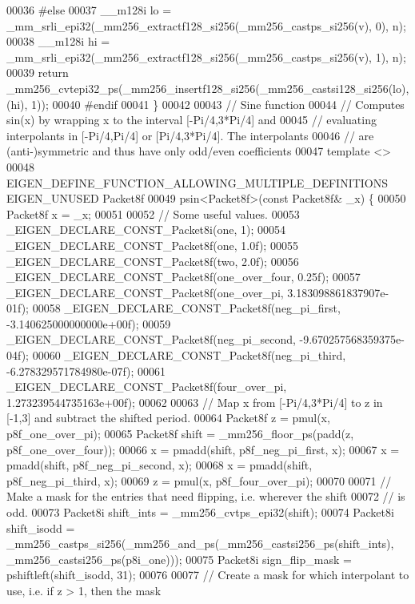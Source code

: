 \begin{DoxyCode}
00036 \textcolor{preprocessor}{#else}
00037   \_\_m128i lo = \_mm\_srli\_epi32(\_mm256\_extractf128\_si256(\_mm256\_castps\_si256(v), 0), n);
00038   \_\_m128i hi = \_mm\_srli\_epi32(\_mm256\_extractf128\_si256(\_mm256\_castps\_si256(v), 1), n);
00039   \textcolor{keywordflow}{return} \_mm256\_cvtepi32\_ps(\_mm256\_insertf128\_si256(\_mm256\_castsi128\_si256(lo), (hi), 1));
00040 \textcolor{preprocessor}{#endif}
00041 \}
00042 
00043 \textcolor{comment}{// Sine function}
00044 \textcolor{comment}{// Computes sin(x) by wrapping x to the interval [-Pi/4,3*Pi/4] and}
00045 \textcolor{comment}{// evaluating interpolants in [-Pi/4,Pi/4] or [Pi/4,3*Pi/4]. The interpolants}
00046 \textcolor{comment}{// are (anti-)symmetric and thus have only odd/even coefficients}
00047 \textcolor{keyword}{template} <>
00048 EIGEN\_DEFINE\_FUNCTION\_ALLOWING\_MULTIPLE\_DEFINITIONS EIGEN\_UNUSED Packet8f
00049 psin<Packet8f>(\textcolor{keyword}{const} Packet8f& \_x) \{
00050   Packet8f x = \_x;
00051 
00052   \textcolor{comment}{// Some useful values.}
00053   \_EIGEN\_DECLARE\_CONST\_Packet8i(one, 1);
00054   \_EIGEN\_DECLARE\_CONST\_Packet8f(one, 1.0f);
00055   \_EIGEN\_DECLARE\_CONST\_Packet8f(two, 2.0f);
00056   \_EIGEN\_DECLARE\_CONST\_Packet8f(one\_over\_four, 0.25f);
00057   \_EIGEN\_DECLARE\_CONST\_Packet8f(one\_over\_pi, 3.183098861837907e-01f);
00058   \_EIGEN\_DECLARE\_CONST\_Packet8f(neg\_pi\_first, -3.140625000000000e+00f);
00059   \_EIGEN\_DECLARE\_CONST\_Packet8f(neg\_pi\_second, -9.670257568359375e-04f);
00060   \_EIGEN\_DECLARE\_CONST\_Packet8f(neg\_pi\_third, -6.278329571784980e-07f);
00061   \_EIGEN\_DECLARE\_CONST\_Packet8f(four\_over\_pi, 1.273239544735163e+00f);
00062 
00063   \textcolor{comment}{// Map x from [-Pi/4,3*Pi/4] to z in [-1,3] and subtract the shifted period.}
00064   Packet8f z = pmul(x, p8f\_one\_over\_pi);
00065   Packet8f shift = \_mm256\_floor\_ps(padd(z, p8f\_one\_over\_four));
00066   x = pmadd(shift, p8f\_neg\_pi\_first, x);
00067   x = pmadd(shift, p8f\_neg\_pi\_second, x);
00068   x = pmadd(shift, p8f\_neg\_pi\_third, x);
00069   z = pmul(x, p8f\_four\_over\_pi);
00070 
00071   \textcolor{comment}{// Make a mask for the entries that need flipping, i.e. wherever the shift}
00072   \textcolor{comment}{// is odd.}
00073   Packet8i shift\_ints = \_mm256\_cvtps\_epi32(shift);
00074   Packet8i shift\_isodd = \_mm256\_castps\_si256(\_mm256\_and\_ps(\_mm256\_castsi256\_ps(shift\_ints), 
      \_mm256\_castsi256\_ps(p8i\_one)));
00075   Packet8i sign\_flip\_mask = pshiftleft(shift\_isodd, 31);
00076 
00077   \textcolor{comment}{// Create a mask for which interpolant to use, i.e. if z > 1, then the mask}

\end{DoxyCode}
